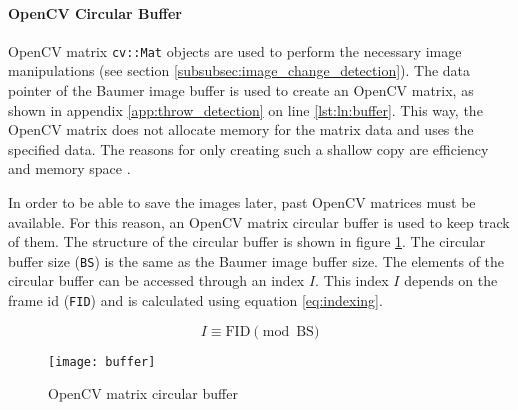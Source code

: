 \paragraph{OpenCV Circular Buffer}
OpenCV matrix \texttt{cv::Mat} objects are used to perform the necessary image manipulations (see section \ref{subsubsec:image_change_detection}).
The data pointer of the Baumer image buffer is used to create an OpenCV matrix, as shown in appendix \ref{app:throw_detection} on line \ref{lst:ln:buffer}.
This way, the OpenCV matrix does not allocate memory for the matrix data and uses the specified data.
The reasons for only creating such a shallow copy are efficiency and memory space \cite{opencv_mat}.

In order to be able to save the images later, past OpenCV matrices must be available.
For this reason, an OpenCV matrix circular buffer is used to keep track of them.
The structure of the circular buffer is shown in figure \ref{fig:circular_buffer}.
The circular buffer size (\texttt{BS}) is the same as the Baumer image buffer size.
The elements of the circular buffer can be accessed through an index $I$.
This index $I$ depends on the frame id (\texttt{FID}) and is calculated using equation \ref{eq:indexing}.

\begin{equation}
  I \equiv \text{FID} \pmod{\text{BS}}
  \label{eq:indexing}
\end{equation}

\begin{figure}[hb]
  \centering
  \texttt{[image: buffer]}
  \caption{OpenCV matrix circular buffer}
  \label{fig:circular_buffer}
\end{figure}
